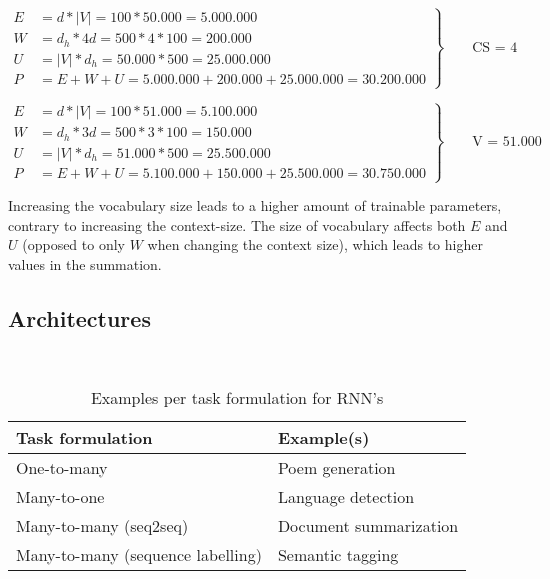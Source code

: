 \documentclass[a4paper, 11pt]{article}
\begin{document}
\begin{equation}
	\left.\begin{aligned}
		E &= d*|V| = 100 * 50.000 = 5.000.000\\
		W &= d_h * 4d = 500 * 4 * 100 = 200.000\\
		U &= |V| * d_h = 50.000 * 500 = 25.000.000\\
		P &= E + W + U = 5.000.000 + 200.000 + 25.000.000 = 30.200.000
	\end{aligned}
	\right\}
	\qquad \text{CS = 4}
\end{equation}

\begin{equation}
	\left.\begin{aligned}
		E &= d*|V| = 100 * 51.000 = 5.100.000\\
		W &= d_h * 3d = 500 * 3 * 100 = 150.000\\
		U &= |V| * d_h = 51.000 * 500 = 25.500.000\\
		P &= E + W + U = 5.100.000 + 150.000 + 25.500.000 = 30.750.000
	\end{aligned}
	\right\}
	\qquad \text{V = 51.000}
\end{equation}

Increasing the vocabulary size leads to a higher amount of trainable parameters, contrary to increasing the context-size. The size of vocabulary affects both $E$ and $U$ (opposed to only $W$ when changing the context size), which leads to higher values in the summation.
\subsection{Architectures}

\noindent{}\\

\begin{table}[h]
	\centering
	\begin{tabular}{l|l}
	\textbf{Task formulation}	& \textbf{Example(s)} \\ \hline
	One-to-many	& Poem generation \\
	Many-to-one	& Language detection \\
	Many-to-many (seq2seq)	& Document summarization \\
	Many-to-many (sequence labelling) & Semantic tagging
	\end{tabular}
	\caption{Examples per task formulation for RNN's}
	\label{tab:examples_rnn}
\end{table}
\end{document}
